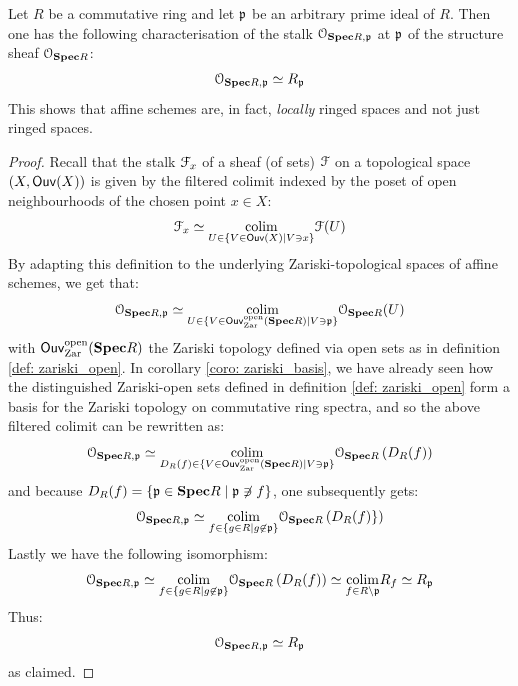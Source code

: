                 \begin{corollary} \label{coro: structure_sheaf_properties}
                    Let $R$ be a commutative ring and let $\mathfrak{p}$ be an arbitrary prime ideal of $R$. Then one has the following characterisation of the stalk $\mathcal{O}_{\mathbf{Spec} R, \mathfrak{p}}$ at $\mathfrak{p}$ of the structure sheaf $\mathcal{O}_{\mathbf{Spec} R}$:
                        $$\mathcal{O}_{\mathbf{Spec} R, \mathfrak{p}} \simeq R_{\mathfrak{p}}$$
                    This shows that affine schemes are, in fact, \textit{locally} ringed spaces and not just ringed spaces. 
                \end{corollary} 
                    \begin{proof}
                        Recall that the stalk $\mathcal{F}_x$ of a sheaf (of sets) $\mathcal{F}$ on a topological space $(X, \mathsf{Ouv}(X))$ is given by the filtered colimit indexed by the poset of open neighbourhoods of the chosen point $x \in X$:
                            $$\mathcal{F}_x \simeq \underset{U \in \{V \in \mathsf{Ouv}(X) \mid V \ni x\}}{\operatorname{colim}} \mathcal{F}(U)$$
                        By adapting this definition to the underlying Zariski-topological spaces of affine schemes, we get that:
                            $$\mathcal{O}_{\mathbf{Spec} R, \mathfrak{p}} \simeq \underset{U \in \{V \in \mathsf{Ouv}_{\mathrm{Zar}}^{\mathrm{open}}(\mathbf{Spec} R) \mid V \ni \mathfrak{p}\}}{\operatorname{colim}} \mathcal{O}_{\mathbf{Spec} R}(U)$$
                        with $\mathsf{Ouv}_{\mathrm{Zar}}^{\mathrm{open}}(\mathbf{Spec} R)$ the Zariski topology defined via open sets as in definition \ref{def: zariski_open}. In corollary \ref{coro: zariski_basis}, we have already seen how the distinguished Zariski-open sets defined in definition \ref{def: zariski_open} form a basis for the Zariski topology on commutative ring spectra, and so the above filtered colimit can be rewritten as:
                            $$\mathcal{O}_{\mathbf{Spec} R, \mathfrak{p}} \simeq \underset{D_R(f) \in \{V \in \mathsf{Ouv}_{\mathrm{Zar}}^{\mathrm{open}}(\mathbf{Spec} R) \mid V \ni \mathfrak{p}\}}{\operatorname{colim}} \mathcal{O}_{\mathbf{Spec} R}\left(D_R(f)\right)$$
                        and because $D_R(f) = \{\mathfrak{p} \in \mathbf{Spec} R \mid \mathfrak{p} \not \ni f\}$, one subsequently gets:
                            $$\mathcal{O}_{\mathbf{Spec} R, \mathfrak{p}} \simeq \underset{f \in \{g \in R \mid g \not \in \mathfrak{p}\}}{\operatorname{colim}} \mathcal{O}_{\mathbf{Spec} R}\left(D_R(f)\}\right)$$
                        Lastly we have the following isomorphism:
                            $$\mathcal{O}_{\mathbf{Spec} R, \mathfrak{p}} \simeq \underset{f \in \{g \in R \mid g \not \in \mathfrak{p}\}}{\operatorname{colim}} \mathcal{O}_{\mathbf{Spec} R}\left(D_R(f)\right) \simeq \underset{f \in R \setminus \mathfrak{p}}{\operatorname{colim}} R_f \simeq R_{\mathfrak{p}}$$
                        Thus:
                            $$\mathcal{O}_{\mathbf{Spec} R, \mathfrak{p}} \simeq R_{\mathfrak{p}}$$
                        as claimed.
                    \end{proof}
                    
